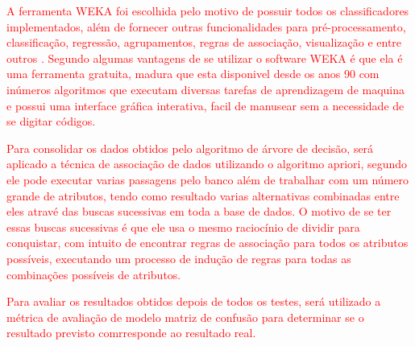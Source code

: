 \par
\textcolor{red}{A ferramenta WEKA foi escolhida pelo motivo de possuir todos os classificadores implementados, além de fornecer outras funcionalidades para pré-processamento, classificação, regressão, agrupamentos, regras de associação, visualização e entre outros \cite{Camilo2009}. Segundo  algumas vantagens de se utilizar o software WEKA é que ela é uma ferramenta gratuita, madura que esta disponivel desde os anos 90 com inúmeros algoritmos que executam diversas tarefas de aprendizagem de maquina e possui uma interface gráfica interativa, facil de manusear sem a necessidade de se digitar códigos.} 

\par
\textcolor{red}{Para consolidar os dados obtidos pelo algoritmo de árvore de decisão, será aplicado a técnica de associação de dados utilizando o algoritmo apriori, segundo  ele pode executar varias passagens pelo banco além de trabalhar com um número grande de atributos, tendo como resultado varias alternativas combinadas entre eles atravé das buscas sucessivas em toda a base de dados. O motivo de se ter essas buscas sucessivas é que ele usa o mesmo raciocínio de dividir para conquistar, com intuito de encontrar regras de associação para todos os atributos possíveis, executando um processo de indução de regras para todas as combinações possíveis de atributos.}

\par
\textcolor{red}{Para avaliar os resultados obtidos depois de todos os testes, será utilizado a métrica de avaliação de modelo matriz de confusão para determinar se o resultado previsto comrresponde ao resultado real.}

